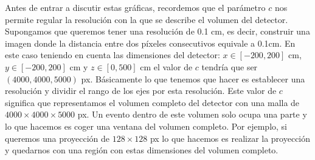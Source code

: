 \documentclass[a4paper,12pt,twoside,titlepage]{article}
\begin{document}
Antes de entrar a discutir estas gráficas, recordemos que el parámetro $c$ nos permite regular la resolución con la que se describe el volumen del detector. Supongamos que queremos tener una resolución de 0.1 cm, es decir, construir una imagen donde la distancia entre dos píxeles consecutivos equivale a 0.1cm. En este caso teniendo en cuenta las dimensiones del detector: $x \in [-200, 200]$ cm, $y \in [-200, 200]$ cm y $z \in [0, 500]$ cm el valor de $c$ tendría que ser $(4000, 4000, 5000)$ px. Básicamente lo que tenemos que hacer es establecer una resolución y dividir el rango de los ejes por esta resolución. Este valor de $c$ significa que representamos el volumen completo del detector con una malla de $4000\times 4000\times 5000$ px. Un evento dentro de este volumen solo ocupa una parte y lo que hacemos es coger una ventana del volumen completo. Por ejemplo, si queremos una proyección de $128\times 128$ px lo que hacemos es realizar la proyección y quedarnos con una región con estas dimensiones del volumen completo.
\end{document}
